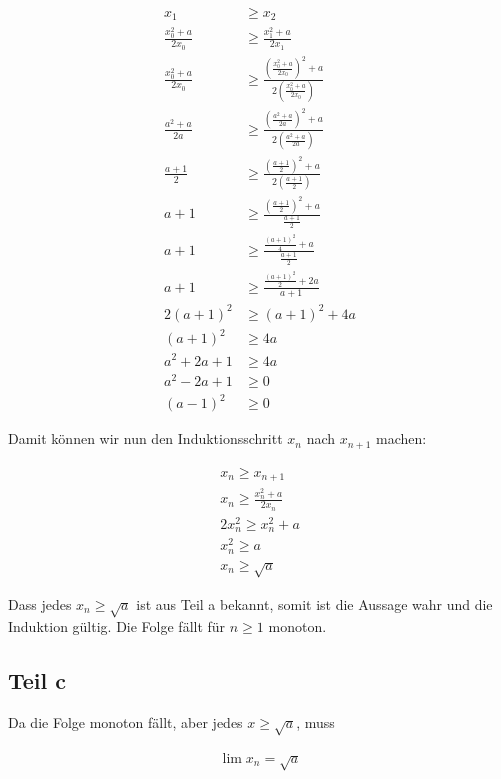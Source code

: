 \documentclass[a4paper,german,12pt,smallheadings]{scrartcl}
\begin{document}
\begin{align*}
  x_1 &\ge x_2 \\
  \frac{x_0^2 + a}{2x_0} &\ge \frac{x_1^2 + a}{2x_1} \\
  \frac{x_0^2 + a}{2x_0} &\ge \frac{\left(\frac{x_0^2 + a}{2x_0}\right)^2 + a}{2\left(\frac{x_0^2 + a}{2x_0}\right)} \\
  \frac{a^2 + a}{2a} &\ge \frac{\left(\frac{a^2 + a}{2a}\right)^2 + a}{2\left(\frac{a^2 + a}{2a}\right)} \\
  \frac{a + 1}{2} &\ge \frac{\left(\frac{a + 1}{2}\right)^2 + a}{2\left(\frac{a + 1}{2}\right)} \\
  a + 1 &\ge \frac{\left(\frac{a + 1}{2}\right)^2 + a}{\frac{a + 1}{2}} \\
  a + 1 &\ge \frac{\frac{(a+1)^2}{4} + a}{\frac{a + 1}{2}} \\
  a + 1 &\ge \frac{\frac{(a+1)^2}{2} + 2a}{a+1} \\
  2(a + 1)^2 &\ge (a+1)^2 + 4a \\
  (a + 1)^2 &\ge 4a \\
  a^2+2a+1 &\ge 4a \\
  a^2-2a+1 &\ge 0 \\
  (a-1)^2 &\ge 0
\end{align*}

Damit können wir nun den Induktionsschritt $x_n$ nach $x_{n+1}$ machen:

\begin{align*}
  x_{n} \ge x_{n+1} \\
  x_n \ge \frac{x_n^2 + a}{2x_n} \\
  2x_n^2 \ge x_n^2 + a \\
  x_n^2 \ge a \\
  x_n \ge \sqrt{a}
\end{align*}

Dass jedes $x_n \ge \sqrt{a}$ ist aus Teil a bekannt, somit ist die Aussage
wahr und die Induktion gültig. Die Folge fällt für $n \ge 1$ monoton.

\subsection*{Teil c}
Da die Folge monoton fällt, aber jedes $x \ge \sqrt{a}$, muss

\begin{align*}
  \lim x_n = \sqrt{a}
\end{align*}
\end{document}
